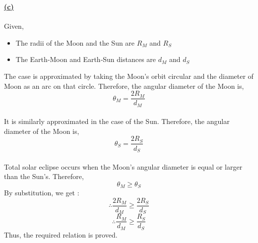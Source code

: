 \documentclass{article}
\begin{document}
{\Large \bfseries \textcolor{blue!90!black}{\ul{(c)}}}\\\\
Given,
\begin{itemize}
    \item  The radii of the Moon and the Sun are $R_M$ and $R_S$
    \item The Earth‑Moon and Earth‑Sun distances are $d_M$ and $d_S$\\
\end{itemize}
The case is approximated by taking the Moon's orbit circular and the diameter of Moon as an arc on that circle. Therefore, the angular diameter of the Moon is,
$$\theta_M=\frac{2R_M}{d_M}$$\\
It is similarly approximated in the case of the Sun. Therefore, the angular diameter of the Moon is,
$$\theta_S=\frac{2R_S}{d_S}$$\\
Total solar eclipse occurs when the Moon's angular diameter is equal or larger than the Sun's. Therefore,
$$\theta_M \geq \theta_S$$
By substitution, we get :
$$\therefore\frac{2R_M}{d_M}\geq \frac{2R_S}{d_S} $$
\[
\boxed{\therefore \frac{R_M}{d_M}\geq \frac{R_S}{d_S} }
\]
Thus, the required relation is proved.
\newpage
\end{document}
